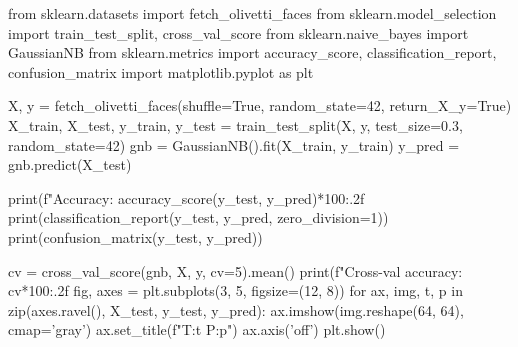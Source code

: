 from sklearn.datasets import fetch_olivetti_faces
from sklearn.model_selection import train_test_split, cross_val_score
from sklearn.naive_bayes import GaussianNB
from sklearn.metrics import accuracy_score, classification_report, confusion_matrix
import matplotlib.pyplot as plt

X, y = fetch_olivetti_faces(shuffle=True, random_state=42, return_X_y=True)
X_train, X_test, y_train, y_test = train_test_split(X, y, test_size=0.3, random_state=42)
gnb = GaussianNB().fit(X_train, y_train)
y_pred = gnb.predict(X_test)

print(f"Accuracy: {accuracy_score(y_test, y_pred)*100:.2f}%
print(classification_report(y_test, y_pred, zero_division=1))
print(confusion_matrix(y_test, y_pred))

cv = cross_val_score(gnb, X, y, cv=5).mean()
print(f"Cross-val accuracy: {cv*100:.2f}%
fig, axes = plt.subplots(3, 5, figsize=(12, 8))
for ax, img, t, p in zip(axes.ravel(), X_test, y_test, y_pred):
    ax.imshow(img.reshape(64, 64), cmap='gray')
    ax.set_title(f"T:{t} P:{p}")
    ax.axis('off')
plt.show()
